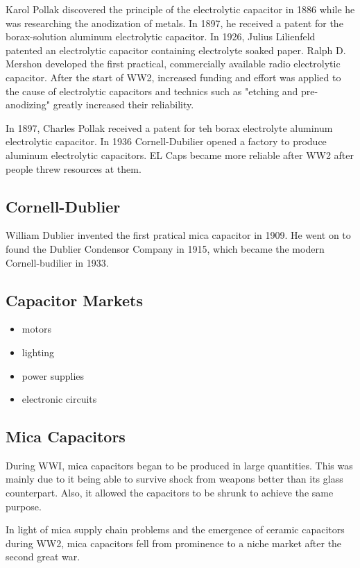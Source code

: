 Karol Pollak discovered the principle of the electrolytic capacitor in 1886 while he was researching the anodization of metals. In 1897, he received a patent for the borax-solution aluminum electrolytic capacitor. In 1926, Julius Lilienfeld patented an electrolytic capacitor containing electrolyte soaked paper. Ralph D. Mershon developed the first practical, commercially available radio electrolytic capacitor. After the start of WW2, increased funding and effort was applied to the cause of electrolytic capacitors and technics such as "etching and pre-anodizing" greatly increased their reliability. \cite{wiki_elec}

In 1897, Charles Pollak received a patent for teh borax electrolyte aluminum electrolytic capacitor. In 1936 Cornell-Dubilier opened a factory to produce aluminum electrolytic capacitors. EL Caps became more reliable after WW2 after people threw resources at them. \cite{deis_hist}

\subsection{Cornell-Dublier}
William Dublier invented the first pratical mica capacitor in 1909. He went on to found the Dublier Condensor Company in 1915, which became the modern Cornell-budilier in 1933.\cite{deis_hist} 

\subsection{Capacitor Markets}
\begin{itemize}
    \item motors
    \item lighting
    \item power supplies
    \item electronic circuits
\end{itemize}
\cite{capRev}

\subsection{Mica Capacitors}
During WWI, mica capacitors began to be produced in large quantities. This was mainly due to it being able to survive shock from weapons better than its glass counterpart. Also, it allowed the capacitors to be shrunk to achieve the same purpose. \cite[f.~37-41]{dumInv}

In light of mica supply chain problems and the emergence of ceramic capacitors during WW2, mica capacitors fell from prominence to a niche market after the second great war.\cite[Ch 3, Sec II]{cerMaterials}

